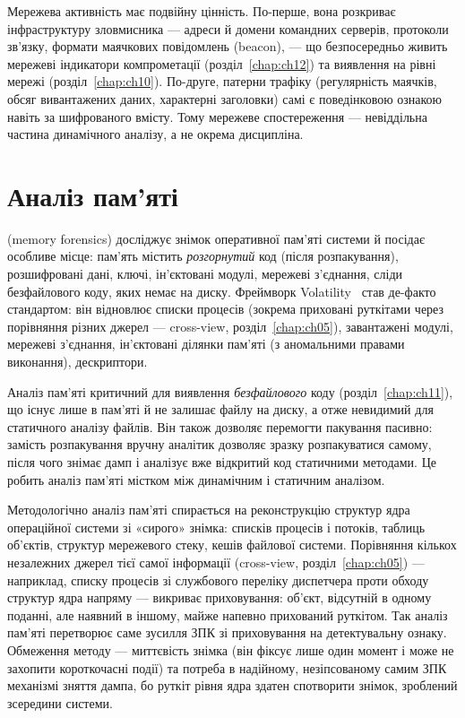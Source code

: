 Мережева активність має подвійну цінність. По-перше, вона розкриває інфраструктуру зловмисника --- адреси й домени командних серверів, протоколи зв'язку, формати маячкових повідомлень (beacon), --- що безпосередньо живить мережеві індикатори компрометації (розділ~\ref{chap:ch12}) та виявлення на рівні мережі (розділ~\ref{chap:ch10}). По-друге, патерни трафіку (регулярність маячків, обсяг вивантажених даних, характерні заголовки) самі є поведінковою ознакою навіть за шифрованого вмісту. Тому мережеве спостереження --- невіддільна частина динамічного аналізу, а не окрема дисципліна.

\section{Аналіз пам'яті}\label{sec:ch07-memory}

 (memory forensics) досліджує знімок оперативної пам'яті системи й посідає особливе місце: пам'ять містить \emph{розгорнутий} код (після розпакування), розшифровані дані, ключі, ін'єктовані модулі, мережеві з'єднання, сліди безфайлового коду, яких немає на диску. Фреймворк Volatility~\cite{ch07:volatility,ch07:ligh} став де-факто стандартом: він відновлює списки процесів (зокрема приховані руткітами через порівняння різних джерел --- cross-view, розділ~\ref{chap:ch05}), завантажені модулі, мережеві з'єднання, ін'єктовані ділянки пам'яті (з аномальними правами виконання), дескриптори.

Аналіз пам'яті критичний для виявлення \emph{безфайлового} коду (розділ~\ref{chap:ch11}), що існує лише в пам'яті й не залишає файлу на диску, а отже невидимий для статичного аналізу файлів. Він також дозволяє перемогти пакування пасивно: замість розпакування вручну аналітик дозволяє зразку розпакуватися самому, після чого знімає дамп і аналізує вже відкритий код статичними методами. Це робить аналіз пам'яті містком між динамічним і статичним аналізом.

Методологічно аналіз пам'яті спирається на реконструкцію структур ядра операційної системи зі «сирого» знімка: списків процесів і потоків, таблиць об'єктів, структур мережевого стеку, кешів файлової системи. Порівняння кількох незалежних джерел тієї самої інформації (cross-view, розділ~\ref{chap:ch05}) --- наприклад, списку процесів зі службового переліку диспетчера проти обходу структур ядра напряму --- викриває приховування: об'єкт, відсутній в одному поданні, але наявний в іншому, майже напевно прихований руткітом. Так аналіз пам'яті перетворює саме зусилля ЗПК зі приховування на детектувальну ознаку. Обмеження методу --- миттєвість знімка (він фіксує лише один момент і може не захопити короткочасні події) та потреба в надійному, незіпсованому самим ЗПК механізмі зняття дампа, бо руткіт рівня ядра здатен спотворити знімок, зроблений зсередини системи.

